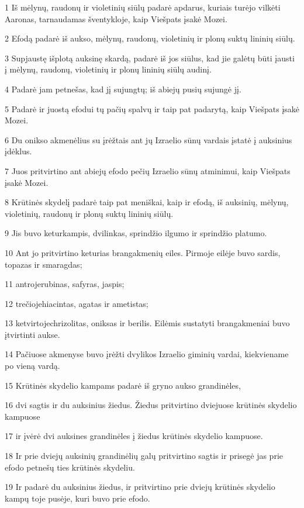 \par 1 Iš mėlynų, raudonų ir violetinių siūlų padarė apdarus, kuriais turėjo vilkėti Aaronas, tarnaudamas šventykloje, kaip Viešpats įsakė Mozei. 
\par 2 Efodą padarė iš aukso, mėlynų, raudonų, violetinių ir plonų suktų lininių siūlų. 
\par 3 Supjaustę išplotą auksinę skardą, padarė iš jos siūlus, kad jie galėtų būti įausti į mėlynų, raudonų, violetinių ir plonų lininių siūlų audinį. 
\par 4 Padarė jam petnešas, kad jį sujungtų; iš abiejų pusių sujungė jį. 
\par 5 Padarė ir juostą efodui tų pačių spalvų ir taip pat padarytą, kaip Viešpats įsakė Mozei. 
\par 6 Du onikso akmenėlius su įrėžtais ant jų Izraelio sūnų vardais įstatė į auksinius įdėklus. 
\par 7 Juos pritvirtino ant abiejų efodo pečių Izraelio sūnų atminimui, kaip Viešpats įsakė Mozei. 
\par 8 Krūtinės skydelį padarė taip pat meniškai, kaip ir efodą, iš auksinių, mėlynų, violetinių, raudonų ir plonų suktų lininių siūlų. 
\par 9 Jis buvo keturkampis, dvilinkas, sprindžio ilgumo ir sprindžio platumo. 
\par 10 Ant jo pritvirtino keturias brangakmenių eiles. Pirmoje eilėje buvo sardis, topazas ir smaragdas; 
\par 11 antroje­rubinas, safyras, jaspis; 
\par 12 trečioje­hiacintas, agatas ir ametistas; 
\par 13 ketvirtoje­chrizolitas, oniksas ir berilis. Eilėmis sustatyti brangakmeniai buvo įtvirtinti aukse. 
\par 14 Pačiuose akmenyse buvo įrėžti dvylikos Izraelio giminių vardai, kiekviename po vieną vardą. 
\par 15 Krūtinės skydelio kampams padarė iš gryno aukso grandinėles, 
\par 16 dvi sagtis ir du auksinius žiedus. Žiedus pritvirtino dviejuose krūtinės skydelio kampuose 
\par 17 ir įvėrė dvi auksines grandinėles į žiedus krūtinės skydelio kampuose. 
\par 18 Ir prie dviejų auksinių grandinėlių galų pritvirtino sagtis ir prisegė jas prie efodo petnešų ties krūtinės skydeliu. 
\par 19 Ir padarė du auksinius žiedus, ir pritvirtino prie dviejų krūtinės skydelio kampų toje pusėje, kuri buvo prie efodo. 
